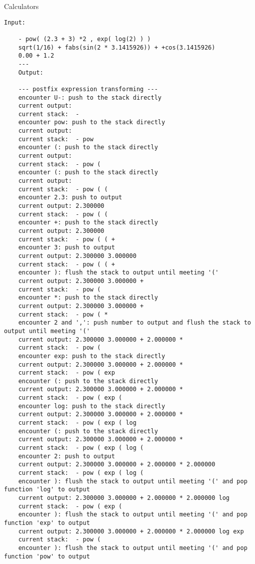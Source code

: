 \begin{homeworkProblem}{Calculators}

    \begin{lstlisting}[breaklines=true]
    Input:

    - pow( (2.3 + 3) *2 , exp( log(2) ) )
    sqrt(1/16) + fabs(sin(2 * 3.1415926)) + +cos(3.1415926)
    0.00 + 1.2
    ---
    Output:

    --- postfix expression transforming ---
    encounter U-: push to the stack directly
    current output:
    current stack:  -
    encounter pow: push to the stack directly
    current output:
    current stack:  - pow
    encounter (: push to the stack directly
    current output:
    current stack:  - pow (
    encounter (: push to the stack directly
    current output:
    current stack:  - pow ( (
    encounter 2.3: push to output
    current output: 2.300000
    current stack:  - pow ( (
    encounter +: push to the stack directly
    current output: 2.300000
    current stack:  - pow ( ( +
    encounter 3: push to output
    current output: 2.300000 3.000000
    current stack:  - pow ( ( +
    encounter ): flush the stack to output until meeting '(' 
    current output: 2.300000 3.000000 +
    current stack:  - pow (
    encounter *: push to the stack directly
    current output: 2.300000 3.000000 +
    current stack:  - pow ( *
    encounter 2 and ',': push number to output and flush the stack to output until meeting '('
    current output: 2.300000 3.000000 + 2.000000 *
    current stack:  - pow (
    encounter exp: push to the stack directly
    current output: 2.300000 3.000000 + 2.000000 *
    current stack:  - pow ( exp
    encounter (: push to the stack directly
    current output: 2.300000 3.000000 + 2.000000 *
    current stack:  - pow ( exp (
    encounter log: push to the stack directly
    current output: 2.300000 3.000000 + 2.000000 *
    current stack:  - pow ( exp ( log
    encounter (: push to the stack directly
    current output: 2.300000 3.000000 + 2.000000 *
    current stack:  - pow ( exp ( log (
    encounter 2: push to output
    current output: 2.300000 3.000000 + 2.000000 * 2.000000
    current stack:  - pow ( exp ( log (
    encounter ): flush the stack to output until meeting '(' and pop function 'log' to output
    current output: 2.300000 3.000000 + 2.000000 * 2.000000 log
    current stack:  - pow ( exp (
    encounter ): flush the stack to output until meeting '(' and pop function 'exp' to output
    current output: 2.300000 3.000000 + 2.000000 * 2.000000 log exp
    current stack:  - pow (
    encounter ): flush the stack to output until meeting '(' and pop function 'pow' to output

\end{lstlisting}
\end{homeworkProblem}
